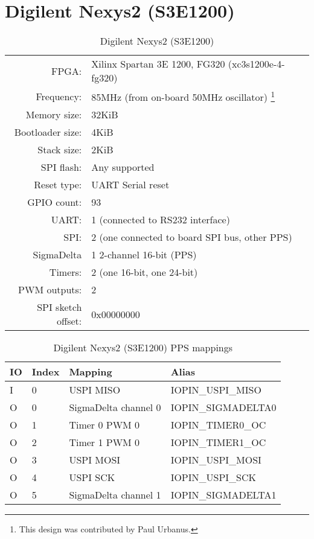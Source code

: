 \section{Digilent Nexys2 (S3E1200)}

\begin{table}[H]
\begin{center}
\begin{tabularx}{14cm}{rX}
FPGA: & Xilinx Spartan 3E 1200, FG320 (xc3s1200e-4-fg320)\\
Frequency: & 85MHz (from on-board 50MHz oscillator) \footnote{This design was contributed by Paul Urbanus.}
\\
Memory size: & 32KiB \\
Bootloader size: & 4KiB \\
Stack size: & 2KiB \\
SPI flash: & Any supported \\
Reset type: & UART Serial reset \\
GPIO count: &  93 \\
UART: & 1 (connected to RS232 interface) \\
SPI: & 2 (one connected to board SPI bus, other PPS) \\
SigmaDelta & 1 2-channel 16-bit (PPS) \\
Timers: & 2 (one 16-bit, one 24-bit) \\
PWM outputs: & 2     \\
SPI sketch offset: & 0x00000000
\end{tabularx}
\caption{Digilent Nexys2 (S3E1200)}
\end{center}
\end{table}

\begin{table}[H]
\begin{center}
\begin{tabularx}{14cm}{lllX}

IO & Index & Mapping & Alias \\
\hline
I & 0 & USPI MISO & IOPIN\_USPI\_MISO \\
O & 0 & SigmaDelta channel 0 & IOPIN\_SIGMADELTA0 \\
O & 1 & Timer 0 PWM 0 &  IOPIN\_TIMER0\_OC \\
O & 2 & Timer 1 PWM 0 & IOPIN\_TIMER1\_OC \\
O & 3 & USPI MOSI & IOPIN\_USPI\_MOSI \\
O & 4 & USPI SCK & IOPIN\_USPI\_SCK \\
O & 5 & SigmaDelta channel 1 & IOPIN\_SIGMADELTA1 \\
\end{tabularx}
\caption{Digilent Nexys2 (S3E1200) PPS mappings}
\end{center}
\end{table}



